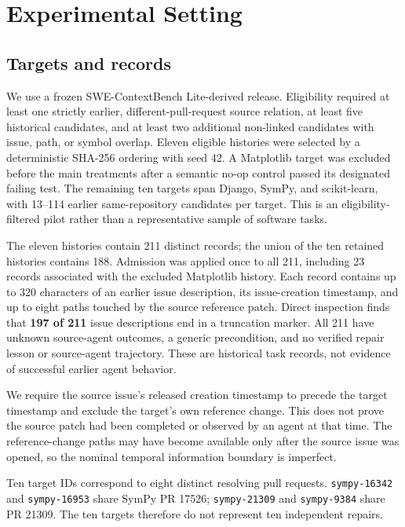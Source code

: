 \documentclass[sigconf,anonymous]{aamas}
\begin{document}
\section{Experimental Setting}
\subsection{Targets and records}
We use a frozen SWE-ContextBench Lite-derived release. Eligibility required at least one strictly earlier, different-pull-request source relation, at least five historical candidates, and at least two additional non-linked candidates with issue, path, or symbol overlap. Eleven eligible histories were selected by a deterministic SHA-256 ordering with seed 42. A Matplotlib target was excluded before the main treatments after a semantic no-op control passed its designated failing test. The remaining ten targets span Django, SymPy, and scikit-learn, with 13--114 earlier same-repository candidates per target. This is an eligibility-filtered pilot rather than a representative sample of software tasks.

The eleven histories contain 211 distinct records; the union of the ten retained histories contains 188. Admission was applied once to all 211, including 23 records associated with the excluded Matplotlib history. Each record contains up to 320 characters of an earlier issue description, its issue-creation timestamp, and up to eight paths touched by the source reference patch. Direct inspection finds that \textbf{197 of 211} issue descriptions end in a truncation marker. All 211 have unknown source-agent outcomes, a generic precondition, and no verified repair lesson or source-agent trajectory. These are historical task records, not evidence of successful earlier agent behavior.

We require the source issue's released creation timestamp to precede the target timestamp and exclude the target's own reference change. This does not prove the source patch had been completed or observed by an agent at that time. The reference-change paths may have become available only after the source issue was opened, so the nominal temporal information boundary is imperfect.

Ten target IDs correspond to eight distinct resolving pull requests. \texttt{sympy-16342} and \texttt{sympy-16953} share SymPy PR 17526; \texttt{sympy-21309} and \texttt{sympy-9384} share PR 21309. The ten targets therefore do not represent ten independent repairs.
\end{document}
